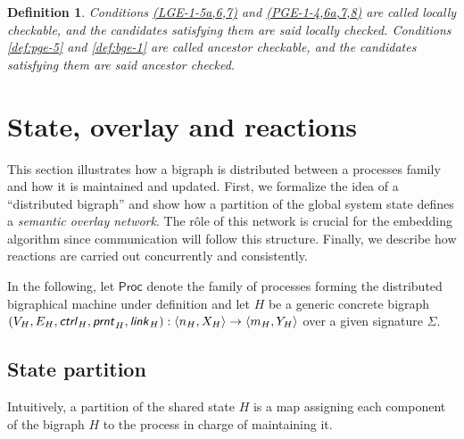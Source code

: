 \documentclass[a4paper,english,10pt]{article}
\theoremstyle{plain}\newtheorem{theorem}{Theorem}
\theoremstyle{plain}\newtheorem{corollary}[theorem]{Corollary}
\theoremstyle{plain}\newtheorem{proposition}[theorem]{Proposition}
\theoremstyle{plain}\newtheorem{lemma}[theorem]{Lemma}
\theoremstyle{plain}\newtheorem{definition}{Definition}
\theoremstyle{plain}\newtheorem{remark}{Remark}
\theoremstyle{plain}\newtheorem{example}[remark]{Example}
\newcommand{\?}[1]{}
\newcommand{\face}[1]{\langle #1 \rangle}
\newcommand{\prnt}{\textsf{\textit{prnt}}}
\newcommand{\ctrl}{\textsf{\textit{ctrl}}}
\newcommand{\link}{\textsf{\textit{link}}}
\newcommand{\msf}[1]{\mathsf{#1}}
\begin{document}
\begin{definition}
	\label{def:locally-checkable}
	\label{def:ancestor-checkable}
	Conditions \hyperref[def:lge]{(LGE-1-5a,6,7)} and
	\hyperref[def:pge]{(PGE-1-4,6a,7,8)} are called 
	\emph{locally checkable}, and the candidates satisfying 
	them are said \emph{locally checked}.
	Conditions \ref{def:pge-5} and \ref{def:bge-1} are called 
	\emph{ancestor checkable}, and the candidates satisfying them are said
	\emph{ancestor checked}.
\end{definition}

\section{State, overlay and reactions}
\label{sec:dbrs}

This section illustrates how a bigraph is distributed between a
processes family and how it is maintained and updated.  First, we
formalize the idea of a ``distributed bigraph'' and show how a
partition of the global system state defines a \emph{semantic overlay
  network}. The r\^ole of this network is crucial for the embedding
algorithm since communication will follow this structure.  Finally, we
describe how reactions are carried out concurrently and consistently.

In the following, let $\msf{Proc}$ denote the family of processes
forming the distributed bigraphical machine under 
definition and let $H$ be a generic concrete bigraph 
$(V_H, E_H, \ctrl_H, \prnt_H, \link_H):\face{n_H,X_H}\to\face{m_H,Y_H}$
over a given signature $\Sigma$.


\subsection{State partition}
\label{sec:dstate}
Intuitively, a partition of the shared state $H$ is a map
assigning each component of the bigraph $H$ to the process in charge of maintaining it.
\end{document}
